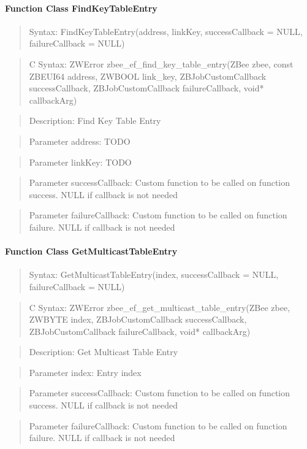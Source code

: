 \paragraph{Function Class FindKeyTableEntry}
\begin{quote}Syntax: FindKeyTableEntry(address, linkKey, successCallback = NULL, failureCallback = NULL)\end{quote}
\begin{quote}C Syntax: ZWError zbee\_ef\_find\_key\_table\_entry(ZBee zbee, const ZBEUI64 address, ZWBOOL link\_key, ZBJobCustomCallback successCallback, ZBJobCustomCallback failureCallback, void* callbackArg)\end{quote}
\begin{quote}Description: Find Key Table Entry\end{quote}
\begin{quote}Parameter address: TODO\end{quote}
\begin{quote}Parameter linkKey: TODO\end{quote}
\begin{quote}Parameter successCallback: Custom function to be called on function success. NULL if callback is not needed\end{quote}
\begin{quote}Parameter failureCallback: Custom function to be called on function failure. NULL if callback is not needed\end{quote}


\paragraph{Function Class GetMulticastTableEntry}
\begin{quote}Syntax: GetMulticastTableEntry(index, successCallback = NULL, failureCallback = NULL)\end{quote}
\begin{quote}C Syntax: ZWError zbee\_ef\_get\_multicast\_table\_entry(ZBee zbee, ZWBYTE index, ZBJobCustomCallback successCallback, ZBJobCustomCallback failureCallback, void* callbackArg)\end{quote}
\begin{quote}Description: Get Multicast Table Entry\end{quote}
\begin{quote}Parameter index: Entry index\end{quote}
\begin{quote}Parameter successCallback: Custom function to be called on function success. NULL if callback is not needed\end{quote}
\begin{quote}Parameter failureCallback: Custom function to be called on function failure. NULL if callback is not needed\end{quote}


